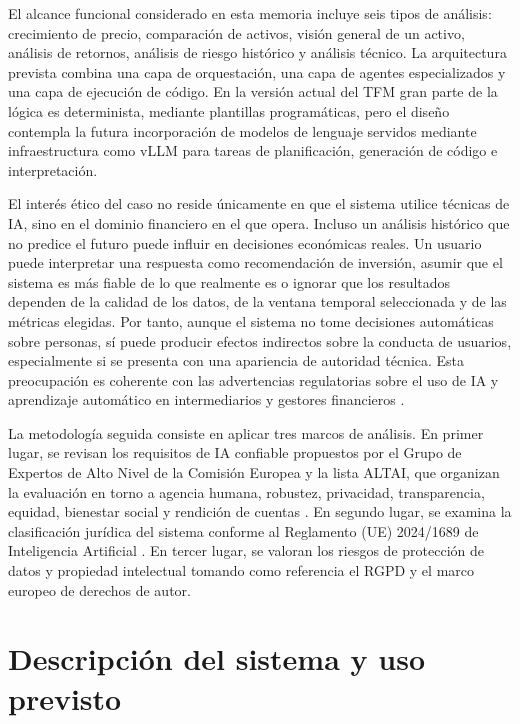 \documentclass{article}
\begin{document}
El alcance funcional considerado en esta memoria incluye seis tipos de análisis: crecimiento de precio, comparación de activos, visión general de un activo, análisis de retornos, análisis de riesgo histórico y análisis técnico. La arquitectura prevista combina una capa de orquestación, una capa de agentes especializados y una capa de ejecución de código. En la versión actual del TFM gran parte de la lógica es determinista, mediante plantillas programáticas, pero el diseño contempla la futura incorporación de modelos de lenguaje servidos mediante infraestructura como vLLM para tareas de planificación, generación de código e interpretación.

El interés ético del caso no reside únicamente en que el sistema utilice técnicas de IA, sino en el dominio financiero en el que opera. Incluso un análisis histórico que no predice el futuro puede influir en decisiones económicas reales. Un usuario puede interpretar una respuesta como recomendación de inversión, asumir que el sistema es más fiable de lo que realmente es o ignorar que los resultados dependen de la calidad de los datos, de la ventana temporal seleccionada y de las métricas elegidas. Por tanto, aunque el sistema no tome decisiones automáticas sobre personas, sí puede producir efectos indirectos sobre la conducta de usuarios, especialmente si se presenta con una apariencia de autoridad técnica. Esta preocupación es coherente con las advertencias regulatorias sobre el uso de IA y aprendizaje automático en intermediarios y gestores financieros \cite{iosco2021ai}.

La metodología seguida consiste en aplicar tres marcos de análisis. En primer lugar, se revisan los requisitos de IA confiable propuestos por el Grupo de Expertos de Alto Nivel de la Comisión Europea y la lista ALTAI, que organizan la evaluación en torno a agencia humana, robustez, privacidad, transparencia, equidad, bienestar social y rendición de cuentas \cite{hleg2019trustworthy,hleg2020altai}. En segundo lugar, se examina la clasificación jurídica del sistema conforme al Reglamento (UE) 2024/1689 de Inteligencia Artificial \cite{eu2024aiact}. En tercer lugar, se valoran los riesgos de protección de datos y propiedad intelectual tomando como referencia el RGPD \cite{eu2016gdpr} y el marco europeo de derechos de autor.

\section{Descripción del sistema y uso previsto}
\end{document}
